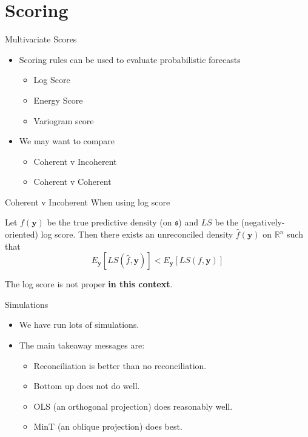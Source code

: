 \documentclass{beamer}
\begin{document}
  \section{Scoring}
  \begin{frame}{Multivariate Scores}
    \begin{itemize}
    \item Scoring rules can be used to evaluate probabilistic forecasts
        \pause
        \begin{itemize}
	      \item Log Score
	      \item Energy Score
	      \item Variogram score
        \end{itemize}
    \pause
    \item We may want to compare
    \begin{itemize}
    	\item Coherent v Incoherent
    	\item Coherent v Coherent
    \end{itemize}
    \end{itemize}
  \end{frame}
  \begin{frame}{Coherent v Incoherent}
	When using log score
	\begin{theorem}
		Let $f(\bm{y})$ be the true predictive density (on $\mathfrak{s}$) and $LS$ be the (negatively-oriented) log score.  Then there exists an unreconciled density  $\hat{f}(\bm{y})$ on $\mathbb{R}^n$ such that
		\begin{equation*}
		E_{\bm y}\left[LS(\hat{f},\bm{y})\right]<E_{\bm y}\left[LS(f,\bm{y})\right]
		\end{equation*}
	\end{theorem}
    The log score is not proper {\bf in this context}.
  \end{frame}
  \begin{frame}{Simulations}
   	\begin{itemize}
   		\item We have run lots of simulations.
   		\pause
   		\item The main takeaway messages are:
   		    \pause
   		    \begin{itemize}
   		    	\item Reconciliation is better than no reconciliation.
   		    	\pause
   		    	\item Bottom up does not do well.
   		    	\pause
   		    	\item OLS (an orthogonal projection) does reasonably well.
   		    	\pause
   		    	\item MinT (an oblique projection) does best.
   		    \end{itemize} 
   	\end{itemize}
   \hfill\hyperlink{sim}{\beamerbutton{}}
   \end{frame}
\end{document}
